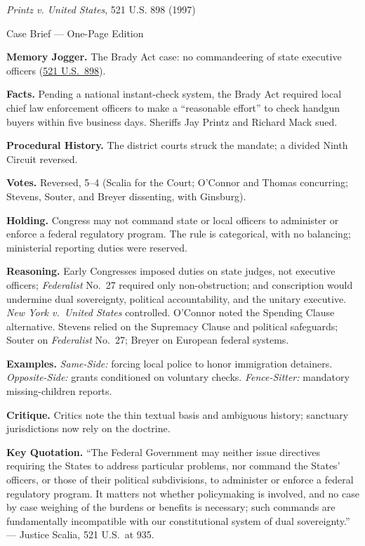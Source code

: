 \documentclass[12pt]{article}
\begin{document}
\begin{center}
{\Large \textit{Printz v. United States}, 521 U.S. 898 (1997)\par}
\vspace{0.3em}
{\normalsize Case Brief --- One-Page Edition\par}
\end{center}

\textbf{Memory Jogger.} The Brady Act case: no commandeering of state executive officers (\href{https://www.law.cornell.edu/supct/html/95-1478.ZO.html}{521 U.S.\ 898}).

\textbf{Facts.} Pending a national instant-check system, the Brady Act required local chief law enforcement officers to make a ``reasonable effort'' to check handgun buyers within five business days. Sheriffs Jay Printz and Richard Mack sued.

\textbf{Procedural History.} The district courts struck the mandate; a divided Ninth Circuit reversed.

\textbf{Votes.} Reversed, 5--4 (Scalia for the Court; O'Connor and Thomas concurring; Stevens, Souter, and Breyer dissenting, with Ginsburg).

\textbf{Holding.} Congress may not command state or local officers to administer or enforce a federal regulatory program. The rule is categorical, with no balancing; ministerial reporting duties were reserved.

\textbf{Reasoning.} Early Congresses imposed duties on state judges, not executive officers; \textit{Federalist} No.\ 27 required only non-obstruction; and conscription would undermine dual sovereignty, political accountability, and the unitary executive. \textit{New York v.\ United States} controlled. O'Connor noted the Spending Clause alternative. Stevens relied on the Supremacy Clause and political safeguards; Souter on \textit{Federalist} No.\ 27; Breyer on European federal systems.

\textbf{Examples.} \emph{Same-Side:} forcing local police to honor immigration detainers. \emph{Opposite-Side:} grants conditioned on voluntary checks. \emph{Fence-Sitter:} mandatory missing-children reports.

\textbf{Critique.} Critics note the thin textual basis and ambiguous history; sanctuary jurisdictions now rely on the doctrine.

\textbf{Key Quotation.} ``The Federal Government may neither issue directives requiring the States to address particular problems, nor command the States' officers, or those of their political subdivisions, to administer or enforce a federal regulatory program. It matters not whether policymaking is involved, and no case by case weighing of the burdens or benefits is necessary; such commands are fundamentally incompatible with our constitutional system of dual sovereignty.'' --- Justice Scalia, 521 U.S.\ at 935.
\end{document}
